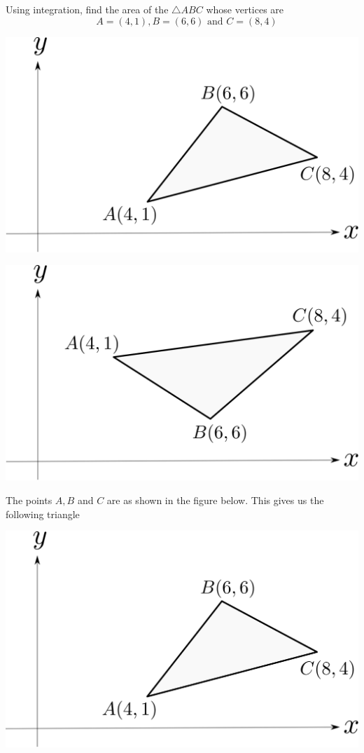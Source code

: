 \documentclass[14pt,fleqn]{extarticle}
\begin{document}
Using integration, find the area of the 
$\triangle ABC$ whose vertices are 
\[ \quad A = (4,1), B = (6,6) \text{ and } C = (8,4) \]
%

\newcard
 
\begin{center} 
\includegraphics[scale=0.35]{img_right.svg} 
\end{center} 

\newcard

\begin{center} 
\includegraphics[scale=0.35]{img_wrong.svg} 
\end{center} 

\newcard 

The points $A,B$ and $C$ are as shown in the figure below. This gives us the following triangle 

\begin{center} 
\includegraphics[scale=0.35]{figure.svg} 
\end{center} 
\end{document}

